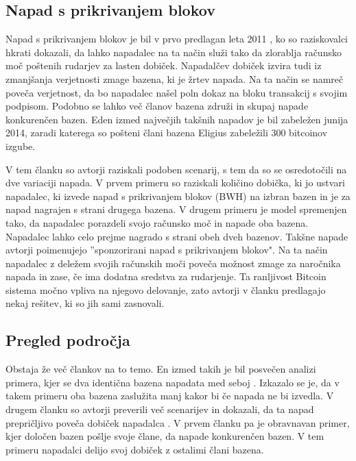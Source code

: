 \documentclass{acm_proc_article-sp}
\begin{document}
\subsection{Napad s prikrivanjem blokov} \label{sekcija2}

Napad s prikrivanjem blokov je bil v prvo predlagan leta 2011 \cite{analysisofbitcoin}, ko so raziskovalci hkrati dokazali, da lahko napadalec na ta način služi tako da zlorablja računsko moč poštenih rudarjev za lasten dobiček. Napadalčev dobiček izvira tudi iz zmanjšanja verjetnosti zmage bazena, ki je žrtev napada. Na ta način se namreč poveča verjetnost, da bo napadalec našel poln dokaz na bloku transakcij s svojim podpisom. Podobno se lahko več članov bazena združi in skupaj napade konkurenčen bazen. Eden izmed največjih takšnih napadov je bil zabeležen junija 2014, zaradi katerega so pošteni člani bazena Eligius zabeležili 300 bitcoinov izgube.

V tem članku so avtorji raziskali podoben scenarij, s tem da so se osredotočili na dve variaciji napada. V prvem primeru so raziskali količino dobička, ki jo ustvari napadalec, ki izvede napad s prikrivanjem blokov (BWH) na izbran bazen in je za napad nagrajen s strani drugega bazena. V drugem primeru je model spremenjen tako, da napadalec porazdeli svojo računsko moč in napade oba bazena. Napadalec lahko celo prejme nagrado s strani obeh dveh bazenov. Takšne napade avtorji poimenujejo ''sponzorirani napad s prikrivanjem blokov". Na ta način napadalec z deležem svojih računskih moči poveča možnost zmage za naročnika napada in zase, če ima dodatna sredstva za rudarjenje.  Ta ranljivost Bitcoin sistema močno vpliva na njegovo delovanje, zato avtorji v članku predlagajo nekaj rešitev, ki so jih sami zasnovali.

\subsection{Pregled področja}
Obstaja že več člankov na to temo. En izmed takih je bil posvečen analizi primera, kjer se dva identična bazena napadata med seboj \cite{minnersdilemma}. Izkazalo se je, da v takem primeru oba bazena zaslužita manj kakor bi če napada ne bi izvedla. V drugem članku so avtorji preverili več scenarijev in dokazali, da ta napad prepričljivo poveča dobiček napadalca \cite{powersplitting}. V prvem članku \cite{minnersdilemma} pa je obravnavan primer, kjer določen bazen pošlje svoje člane, da napade konkurenčen bazen. V tem primeru napadalci delijo svoj dobiček z ostalimi člani bazena.
\end{document}

